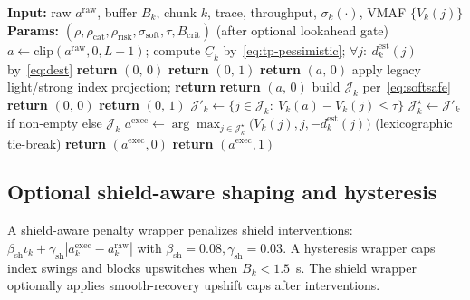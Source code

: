 \documentclass[preprint,12pt,times]{elsarticle}
\begin{document}
\begin{algorithm}[!htbp]
\footnotesize
\caption{VMAF-aware perceptual projection}
\label{alg:shield-vmaf}
\begin{algorithmic}[1]
\STATE \textbf{Input:} raw \(a^{\mathrm{raw}}\), buffer \(B_k\), chunk \(k\), trace, throughput, \(\sigma_k(\cdot)\), VMAF \(\{V_k(j)\}\)
\STATE \textbf{Params:} \((\rho,\rho_{\mathrm{cat}},\rho_{\mathrm{risk}},\sigma_{\mathrm{soft}},\tau,B_{\mathrm{crit}})\) (after optional lookahead gate)
\STATE \(a\leftarrow \mathrm{clip}(a^{\mathrm{raw}},0,L{-}1)\); compute \(\underline{C}_k\) by~\eqref{eq:tp-pessimistic}; \(\forall j:\ d^{\mathrm{est}}_k(j)\) by~\eqref{eq:dest}
     \STATE \textbf{return} \((0,\,0)\) \ELSE \STATE \textbf{return} \((0,\,1)\) \ENDIF
\ENDIF
{}
    \STATE \textbf{return} \((a,\,0)\)
\ENDIF
{}
    \STATE apply legacy light/strong index projection; \textbf{return}
\ENDIF
{}
    \STATE \textbf{return} \((a,\,0)\)
\ENDIF
\STATE build \(\mathcal{J}_k\) per~\eqref{eq:softsafe}
     \STATE \textbf{return} \((0,\,0)\) \ELSE \STATE \textbf{return} \((0,\,1)\) \ENDIF
\ENDIF
\STATE \(\mathcal{J}'_k\leftarrow\{j\in\mathcal{J}_k:\ V_k(a)-V_k(j)\le\tau\}\)
\STATE \(\mathcal{J}^\star_k\leftarrow \mathcal{J}'_k\) if non-empty else \(\mathcal{J}_k\)
\STATE \(a^{\mathrm{exec}}\leftarrow \arg\max_{j\in\mathcal{J}^\star_k}\bigl(V_k(j), j, -d^{\mathrm{est}}_k(j)\bigr)\)
\STATE (lexicographic tie-break)
 \STATE \textbf{return} \((a^{\mathrm{exec}},0)\) \ELSE \STATE \textbf{return} \((a^{\mathrm{exec}},1)\) \ENDIF
\end{algorithmic}
\end{algorithm}

\subsection{Optional shield-aware shaping and hysteresis}

A shield-aware penalty wrapper penalizes shield interventions: \(\beta_{\mathrm{sh}}\iota_k+\gamma_{\mathrm{sh}}|a^{\mathrm{exec}}_k-a^{\mathrm{raw}}_k|\) with \(\beta_{\mathrm{sh}}{=}0.08,\gamma_{\mathrm{sh}}{=}0.03\).
A hysteresis wrapper caps index swings and blocks upswitches when \(B_k<1.5\)~s.
The shield wrapper optionally applies smooth-recovery upshift caps after interventions.
\end{document}

